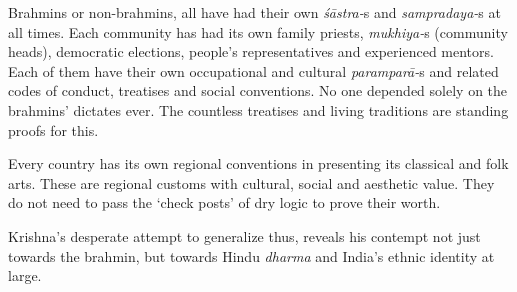 Brahmins or non-brahmins, all have had their own \textit{śāstra-}s and \textit{sampradaya-}s at all times. Each community has had its own family priests, \textit{mukhiya-}s (community heads), democratic elections, people’s representatives and experienced mentors. Each of them have their own occupational and cultural \textit{paramparā-}s and related codes of conduct, treatises and social conventions. No one depended solely on the brahmins’ dictates ever. The countless treatises and living traditions are standing proofs for this.

Every country has its own regional conventions in presenting its classical and folk arts. These are regional customs with cultural, social and aesthetic value. They do not need to pass the ‘check posts’ of dry logic to prove their worth.

Krishna’s desperate attempt to generalize thus, reveals his contempt not just towards the brahmin, but towards Hindu \textit{dharma} and India’s ethnic identity at large.

